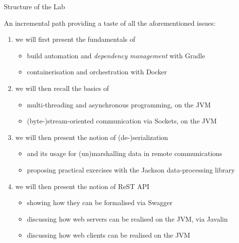 \documentclass[presentation]{beamer}\mode<presentation>{\usetheme{AMSBolognaFC}}
\begin{document}
\begin{frame}[c,allowframebreaks]{Structure of the Lab}

    An incremental path providing a taste of all the aforementioned issues: %
    \medskip
    \begin{enumerate}
        \item we will first present the fundamentals of
        \begin{itemize}
            \item \alert{build automation} and \emph{dependency management} with Gradle
            \item \alert{containerisation} and \alert{orchestration} with Docker
        \end{itemize}

        \medskip

        \item we will then recall the basics of
        \begin{itemize}
            \item \alert{multi-threading} and \alert{asynchronous programming}, on the JVM
            \item (byte-)stream-oriented \alert{communication via Sockets}, on the JVM
        \end{itemize}

        \medskip

        \item we will then present the notion of \alert{(de-)serialization}
        \begin{itemize}
            \item and its usage for (un)marshalling data in remote communications
            \item proposing practical exercises with the Jackson data-processing library
        \end{itemize}

        \framebreak

        \item we will then present the notion of \alert{ReST API}
        \begin{itemize}
            \item showing how they can be \alert{formalised} via Swagger
            \item discussing how \alert{web servers} can be realised on the JVM, via Javalin
            \item discussing how \alert{web clients} can be realised on the JVM
        \end{itemize}


\end{enumerate}
\end{frame}
\end{document}
